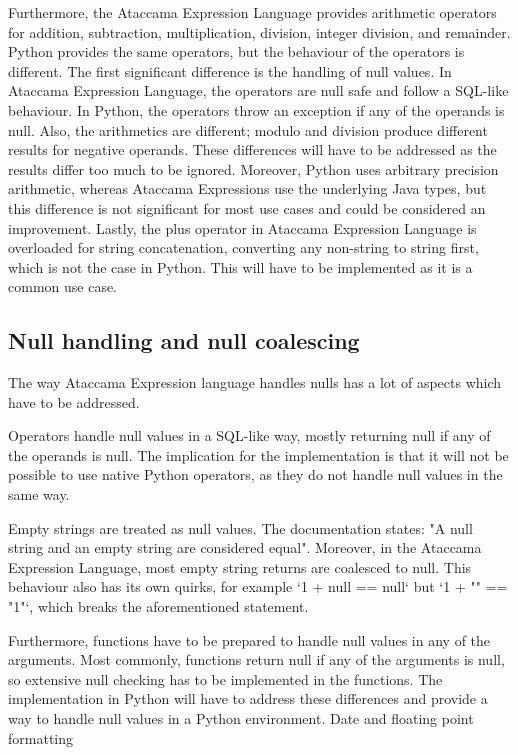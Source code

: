Furthermore, the Ataccama Expression Language provides arithmetic operators
for addition, subtraction, multiplication, division, integer division, and remainder. 
Python provides the same operators, but
the behaviour of the operators is different. The first significant difference
is the handling of null values. In Ataccama Expression Language, the operators are null safe and
follow a SQL-like behaviour. In Python, the operators throw an exception if any of the operands is null.
Also, the arithmetics are different; modulo and division produce different results for negative operands. These differences will have to be addressed as the
results differ too much to be ignored.  Moreover, Python uses arbitrary precision arithmetic, whereas Ataccama Expressions use the underlying Java types, but this difference is not significant for most use cases and could be considered an improvement. 
Lastly, the plus operator in Ataccama Expression Language is overloaded for string concatenation, converting any non-string to string first, which is not the case in Python. This will have to be implemented as it is a common use case.


\subsection{Null handling and null coalescing}

The way Ataccama Expression language handles nulls has a lot of aspects
which have to be addressed.

Operators handle null values in a SQL-like way, mostly returning null if any
of the operands is null. The implication for the implementation is that it will not be
possible to use native Python operators, as they do not handle null values in the
same way.

Empty strings are treated as null values. The documentation states: "A null
string and an empty string are considered equal". Moreover, in the Ataccama Expression Language, most empty string
returns are coalesced to null. This behaviour also has its own quirks, for example
‘1 + null == null‘ but ‘1 + "" == "1"‘, which breaks the aforementioned statement.

Furthermore, functions have to be prepared to handle null values in any of the
arguments. Most commonly, functions return null if any of the arguments is null,
so extensive null checking has to be implemented in the functions.
The implementation in Python will have to address these differences and
provide a way to handle null values in a Python environment.
Date and floating point formatting

